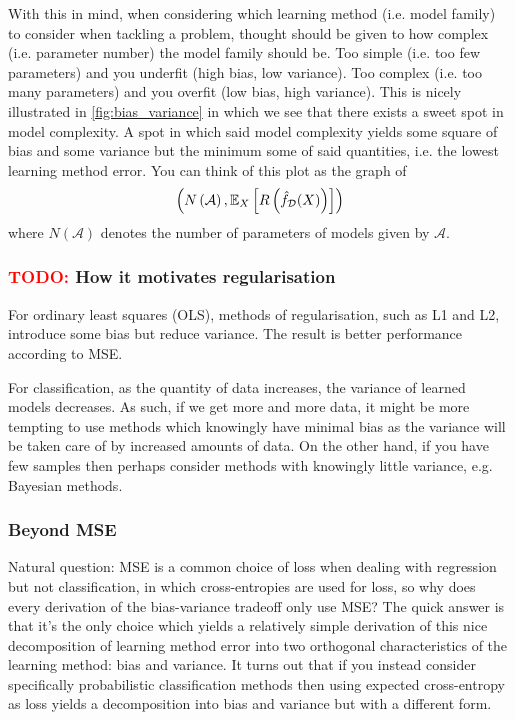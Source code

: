 \documentclass[11pt]{article}
\begin{document}
With this in mind, when considering which learning method (i.e. model family) to consider when tackling a problem, thought should be given to how complex (i.e. parameter number) the model family should be. Too simple (i.e. too few parameters) and you underfit (high bias, low variance). Too complex (i.e. too many parameters) and you overfit (low bias, high variance). This is nicely illustrated in \autoref{fig:bias_variance} in which we see that there exists a sweet spot in model complexity. A spot in which said model complexity yields some square of bias and some variance but the minimum some of said quantities, i.e. the lowest learning method error. You can think of this plot as the graph of
$$
\left(N\left(\mathcal{A}\right),\mathbb{E}_X\left[R\left(\hat{f}_{\mathcal{D}}(X)\right)\right]\right)
$$
where $N(\mathcal{A})$ denotes the number of parameters of models given by $\mathcal{A}$.

\subsubsection{\textcolor{red}{TODO:} How it motivates regularisation}
For ordinary least squares (OLS), methods of regularisation, such as L1 and L2, introduce some bias but reduce variance. The result is better performance according to MSE.

For classification, as the quantity of data increases, the variance of learned models decreases. As such, if we get more and more data, it might be more tempting to use methods which knowingly have minimal bias as the variance will be taken care of by increased amounts of data. On the other hand, if you have few samples then perhaps consider methods with knowingly little variance, e.g. Bayesian methods.

\subsubsection{Beyond MSE}
Natural question: MSE is a common choice of loss when dealing with regression but not classification, in which cross-entropies are used for loss, so why does every derivation of the bias-variance tradeoff only use MSE? The quick answer is that it's the only choice which yields a relatively simple derivation of this nice decomposition of learning method error into two orthogonal characteristics of the learning method: bias and variance. It turns out that if you instead consider specifically probabilistic classification methods then using expected cross-entropy as loss yields a decomposition into bias and variance but with a different form.
\end{document}
